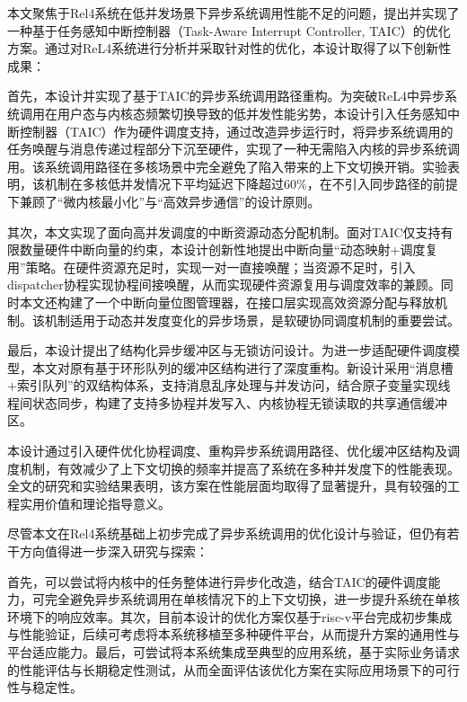 \begin{conclusion}

本文聚焦于Rel4系统在低并发场景下异步系统调用性能不足的问题，提出并实现了一种基于任务感知中断控制器（Task-Aware Interrupt Controller, TAIC）的优化方案。通过对ReL4系统进行分析并采取针对性的优化，本设计取得了以下创新性成果：

首先，本设计并实现了基于TAIC的异步系统调用路径重构。为突破ReL4中异步系统调用在用户态与内核态频繁切换导致的低并发性能劣势，本设计引入任务感知中断控制器（TAIC）作为硬件调度支持，通过改造异步运行时，将异步系统调用的任务唤醒与消息传递过程部分下沉至硬件，实现了一种无需陷入内核的异步系统调用。该系统调用路径在多核场景中完全避免了陷入带来的上下文切换开销。实验表明，该机制在多核低并发情况下平均延迟下降超过60\%，在不引入同步路径的前提下兼顾了“微内核最小化”与“高效异步通信”的设计原则。

其次，本文实现了面向高并发调度的中断资源动态分配机制。面对TAIC仅支持有限数量硬件中断向量的约束，本设计创新性地提出中断向量“动态映射+调度复用”策略。在硬件资源充足时，实现一对一直接唤醒；当资源不足时，引入dispatcher协程实现协程间接唤醒，从而实现硬件资源复用与调度效率的兼顾。同时本文还构建了一个中断向量位图管理器，在接口层实现高效资源分配与释放机制。该机制适用于动态并发度变化的异步场景，是软硬协同调度机制的重要尝试。

最后，本设计提出了结构化异步缓冲区与无锁访问设计。为进一步适配硬件调度模型，本文对原有基于环形队列的缓冲区结构进行了深度重构。新设计采用“消息槽+索引队列”的双结构体系，支持消息乱序处理与并发访问，结合原子变量实现线程间状态同步，构建了支持多协程并发写入、内核协程无锁读取的共享通信缓冲区。

本设计通过引入硬件优化协程调度、重构异步系统调用路径、优化缓冲区结构及调度机制，有效减少了上下文切换的频率并提高了系统在多种并发度下的性能表现。全文的研究和实验结果表明，该方案在性能层面均取得了显著提升，具有较强的工程实用价值和理论指导意义。

尽管本文在Rel4系统基础上初步完成了异步系统调用的优化设计与验证，但仍有若干方向值得进一步深入研究与探索：

首先，可以尝试将内核中的任务整体进行异步化改造，结合TAIC的硬件调度能力，可完全避免异步系统调用在单核情况下的上下文切换，进一步提升系统在单核环境下的响应效率。其次，目前本设计的优化方案仅基于risc-v平台完成初步集成与性能验证，后续可考虑将本系统移植至多种硬件平台，从而提升方案的通用性与平台适应能力。最后，可尝试将本系统集成至典型的应用系统，基于实际业务请求的性能评估与长期稳定性测试，从而全面评估该优化方案在实际应用场景下的可行性与稳定性。

\end{conclusion}
